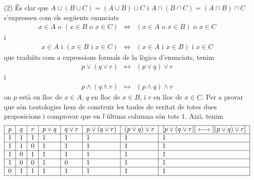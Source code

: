 \begin{solucio}
(2) \'{E}s clar que $A\cup (B\cup C)=(A\cup B)\cup C$ i $A\cap (B\cap
C)=(A\cap B)\cap C$ s'expressen com els seg\"{u}ents enunciats%
\begin{equation*}
\begin{array}{ccc}
x\in A\text{ o }\left( x\in B\text{ o }x\in C\right) & \Longleftrightarrow &
\left( x\in A\text{ o }x\in B\right) \text{ o }x\in C%
\end{array}%
\end{equation*}%
i%
\begin{equation*}
\begin{array}{ccc}
x\in A\text{ i }\left( x\in B\text{ i }x\in C\right) & \Longleftrightarrow &
\left( x\in A\text{ i }x\in B\right) \text{ i }x\in C%
\end{array}%
\end{equation*}%
que tradu\"{\i}ts com a expressions formals de la l\`{o}gica d'enunciats,
tenim%
\begin{equation*}
\begin{array}{ccc}
p\vee (q\vee r) & \longleftrightarrow & (p\vee q)\vee r%
\end{array}%
\end{equation*}%
i%
\begin{equation*}
\begin{array}{ccc}
p\wedge (q\wedge r) & \longleftrightarrow & (p\wedge q)\wedge r%
\end{array}%
\end{equation*}%
on $p$ est\`{a} en lloc de $x\in A$, $q$ en lloc de $x\in B$, i $r$ en lloc
de $x\in C$. Per a provar que s\'{o}n tautologies hem de construir les
taules de veritat de totes dues proposicions i comprovar que en l'\'{u}ltima
columna s\'{o}n tots $1$. Aix\'{\i}, tenim%
\begin{equation*}
\begin{tabular}{|l|l|l|l|l|l|l|l|}
\hline
$p$ & $q$ & $r$ & $p\vee q$ & $q\vee r$ & $p\vee (q\vee r)$ & $(p\vee q)\vee
r$ & $\left[ p\vee (q\vee r)\right] \longleftrightarrow \left[ (p\vee q)\vee
r\right] $ \\ \hline
$1$ & $1$ & $1$ & $1$ & $1$ & $1$ & $1$ & $1$ \\ \hline
$1$ & $1$ & $0$ & $1$ & $1$ & $1$ & $1$ & $1$ \\ \hline
$1$ & $0$ & $1$ & $1$ & $1$ & $1$ & $1$ & $1$ \\ \hline
$1$ & $0$ & $0$ & $1$ & $0$ & $1$ & $1$ & $1$ \\ \hline
$0$ & $1$ & $1$ & $1$ & $1$ & $1$ & $1$ & $1$ \\ \hline

\end{tabular}
\end{equation*}
\end{solucio}
